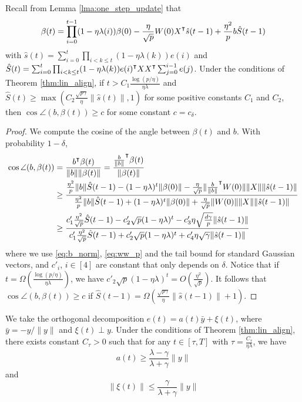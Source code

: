 \begin{lemma}
\label{lma:suf_cond}
Recall from Lemma \ref{lma:one_step_update} that
\begin{equation*}
\beta(t)=\prod_{i=0}^{t-1}(1-\eta\lambda(i))\beta(0) -\frac{\eta}{\sqrt p}W(0)X\transpose \hat{s}(t-1) +\frac{\eta^2}{p}b \hat{S}(t-1)
\end{equation*}
with $\hat{s}(t) = \sum_{i=0}^{t}\prod_{i<k\leq t}(1-\eta\lambda(k)) e(i)$ and $\hat{S}(t) = \sum_{i=0}^{t}\prod_{i<k\leq t}(1-\eta\lambda(k))e(i)\transpose XX\transpose \sum_{j=0}^{i-1}e(j)$. Under the conditions of Theorem \ref{thm:lin_align}, if $t>C_1\frac{\log (p/\eta)}{\eta\lambda}$ and $\hat{S}(t)\geq \max(C_2\frac{\sqrt{p\gamma}}{\eta}\|\hat{s}(t)\|,1)$ for some positive constants $C_1$ and $C_2$, then $\cos\angle(b, \beta(t)) \geq c$ for some constant $c=c_\delta$.
\end{lemma}
\begin{proof}
We compute the cosine of the angle between $\beta(t)$ and $b$. With probability $1-\delta$,
\begin{equation*}
\begin{aligned}
    \cos\angle(b, \beta(t)) 
    &= \frac{b\transpose \beta(t)}{\|b\|\|\beta(t)\|}= \frac{\frac{b}{\|b\|}\transpose \beta(t)}{\|\beta(t)\|}\\
    &\geq \frac{\frac{\eta^2}{p}\|b\|\hat{S}(t-1) - (1-\eta\lambda)^t\|\beta(0)\| - \frac{\eta}{\sqrt p}\|\frac{b}{\|b\|}\transpose W(0)\|\|X\|\|\hat{s}(t-1)\|}{\frac{\eta^2}{p}\|b\|\hat{S}(t-1)+(1-\eta\lambda)^t\|\beta(0)\| + \frac{\eta}{\sqrt p}\|W(0)\|\|X\|\|\hat{s}(t-1)\|} \\
    &\geq \frac{c'_1\frac{\eta^2}{\sqrt p}\hat{S}(t-1) - c'_2\sqrt p(1-\eta\lambda)^t- c'_3\eta\sqrt{\frac{d\gamma}{p}}\|\hat{s}(t-1)\|}{c'_1\frac{\eta^2}{\sqrt p}\hat{S}(t-1) + c'_2\sqrt p(1-\eta\lambda)^t+ c'_4\eta\sqrt{\gamma}\|\hat{s}(t-1)\|}
\end{aligned}
\end{equation*}
where we use \eqref{eq:b_norm}, \eqref{eq:ww_p} and the tail bound for standard Gaussian vectors, and $c'_i$, $i\in[4]$ are constant that only depends on $\delta$. Notice that if $t=\Omega(\frac{\log (p/\eta)}{\eta\lambda})$, we have $c'_2\sqrt p(1-\eta\lambda)^t = O(\frac{\eta^2}{\sqrt p})$. It follows that $\cos\angle(b, \beta(t)) \geq c$ if $\hat{S}(t-1)=\Omega(\frac{\sqrt{p\gamma}}{\eta}\|\hat{s}(t-1)\|+1)$.
\end{proof}

\begin{lemma}
\label{lma:decomp_1}
We take the orthogonal decomposition $e(t) = a(t)\bar{y}+\xi(t)$, where $\bar{y}=-y/\|y\|$ and $\xi(t)\perp y$. Under the conditions of Theorem \ref{thm:lin_align}, there exists constant $C_\tau>0$ such that for any $t\in[\tau,T]$ with $\tau=\frac{C_\tau}{\eta\lambda}$, we have
\begin{equation}
\label{eq:at_lbd}
a(t)\geq \frac{\lambda - \gamma}{\lambda+\gamma}\|y\|  
\end{equation}
and 
\begin{equation}
\label{eq:xit_ubd}
\|\xi(t)\|\leq \frac{\gamma}{\lambda+\gamma}\|y\|
\end{equation}
\end{lemma}

